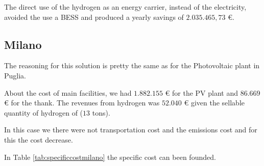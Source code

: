 The direct use of the hydrogen as an energy carrier, instead of the electricity, avoided the use a BESS and produced a yearly savings of $2.035.465,73$ €. 



\subsection{Milano}
The reasoning for this solution is pretty the same as for the Photovoltaic plant in Puglia.

About the cost of main facilities, we had $1.882.155$ € for the PV plant and $86.669$ € for the thank. The revenues from hydrogen was $52.040$ € given the sellable quantity of hydrogen of ($13$ tons).

In this case we there were not transportation cost and the emissions cost and for this the cost decrease. 

In Table \ref{tab:specificcostmilano} the specific cost can been founded.

